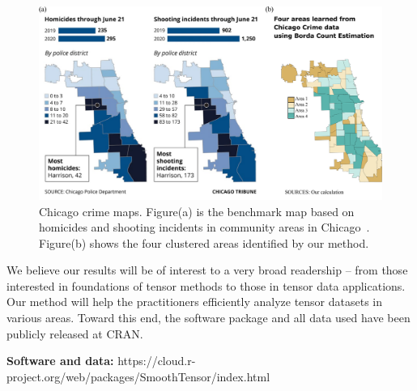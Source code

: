 \documentclass[11pt]{article}
\theoremstyle{definition}
\begin{document}
\begin{figure}[ht!]
    \centering
    \includegraphics[width = \textwidth]{figure/crimecompare.pdf}
    \caption{Chicago crime maps. Figure(a) is the benchmark map based on homicides and shooting incidents in community areas in Chicago~\citep{Jeremy.2020}. Figure(b) shows the four clustered areas identified by our method.}
    \label{fig:area}
\end{figure}


We believe our results will be of interest to a very broad readership -- from those interested in foundations of tensor methods to those in tensor data applications. Our method will help the practitioners efficiently analyze tensor datasets in various areas. Toward this end, the software package and all data used have been publicly released at CRAN.

{\bf \large Software and data:} https://cloud.r-project.org/web/packages/SmoothTensor/index.html


{\small
\vspace{-.1cm}

}
\end{document}
